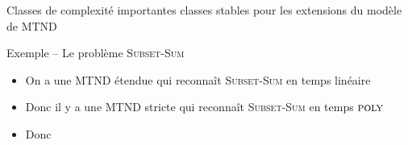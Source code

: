\begin{frame}{Classes de complexité importantes}
   classes stables pour les extensions du modèle de MTND

  \begin{exampleblock}{Exemple -- Le problème \textsc{Subset-Sum}}
    \begin{itemize}
    \item On a une MTND étendue qui reconnaît \textsc{Subset-Sum} en temps linéaire
    \item Donc il y a une MTND stricte qui reconnaît \textsc{Subset-Sum} en temps $\textsc{poly}$
    \item Donc 
    \end{itemize}
  \end{exampleblock}
  
\end{frame}

\endgroup
\endinput
